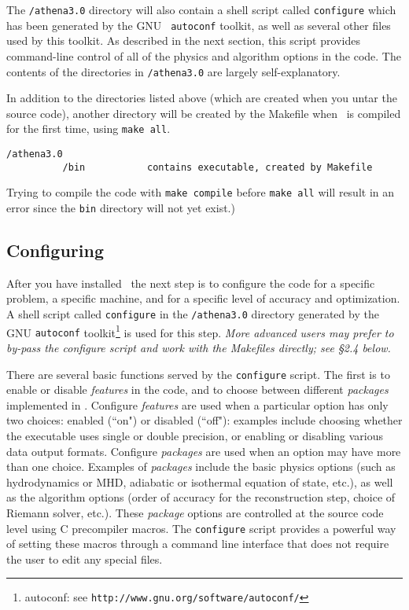 The {\tt /athena3.0} directory will also contain a shell script
called {\tt configure} which has been generated by the GNU {\tt
autoconf} toolkit, as well as several other files used by this
toolkit.  As described in the next section, this script provides command-line
control of all of the physics and algorithm options in the code.
The contents of the directories in {\tt /athena3.0} are largely
self-explanatory.

In addition to the directories listed above (which are created when you
untar the source code), another directory will be created by the Makefile
when \ath\ is compiled for the first time, using {\tt make all}.

\footnotesize
\begin{verbatim}
/athena3.0
          /bin           contains executable, created by Makefile
\end{verbatim}
\normalsize

Trying to compile the code with {\tt make compile} before
{\tt make all} will result in an error since the {\tt bin} directory will
not yet exist.)

\subsection{Configuring \ath}

After you have installed \ath\, the next step is to configure the code
for a specific problem, a specific machine, and for a specific level of
accuracy and optimization.  A shell script called {\tt configure} in the 
{\tt /athena3.0} directory generated by the GNU
{\tt autoconf} toolkit\footnote{autoconf: see {\tt http://www.gnu.org/software/autoconf/}} is used for this step.
{\em More advanced users 
may prefer to by-pass the configure script and work with the Makefiles 
directly; see \S 2.4 below.}

There are several basic functions served by the {\tt configure} script.
The first is to enable or disable {\it features} in the code, and to
choose between different {\it packages} implemented in \ath.  Configure 
{\it features}
are used when a particular option has only two choices: enabled (``on")
or disabled (``off"): examples include choosing whether the executable
uses single or double precision, or enabling or disabling various data
output formats.  Configure {\it packages} are used when an option may have
more than one choice.  Examples of {\it packages} include the basic
physics options (such as hydrodynamics or MHD, adiabatic or isothermal
equation of state, etc.), as well as the algorithm options (order of
accuracy for the reconstruction step, choice of Riemann solver, etc.).
These {\it package} options are controlled at the source code level using C
precompiler macros.  The {\tt configure} script provides a powerful way
of setting these macros through a command line interface that does not
require the user to edit any special files.

